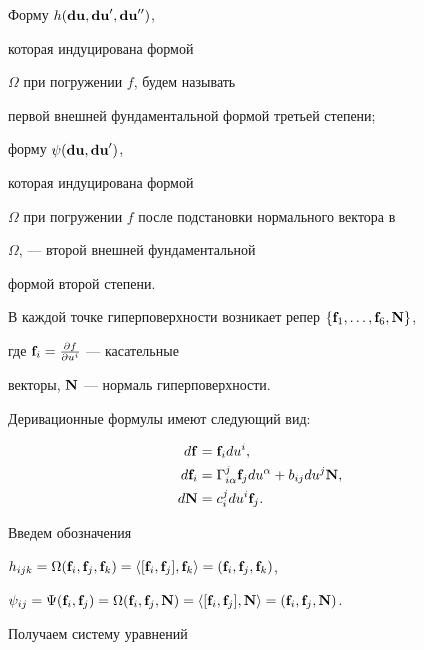Форму $h(\bold{du}, \bold{du}', \bold{du}'')$,


которая индуцирована формой


$\Omega$ при погружении $f$, будем называть


первой внешней фундаментальной формой третьей степени;


форму $\psi(\bold{du}, \bold{du}')$,


которая индуцирована формой


$\Omega$ при погружении $f$ после подстановки нормального вектора в


$\Omega$, --- второй внешней фундаментальной


формой второй степени.





В каждой точке гиперповерхности возникает репер $\{\bold{f}_1,\dotsc,


\bold{f}_6, \bold{N}\}$,


где $\bold{f}_i={\frac{\partial f}{\partial u^i}}$ --- касательные


векторы, $\bold{N}$ --- нормаль гиперповерхности.


Деривационные формулы имеют следующий вид:


\begin{align*}


d\bold{f}&=\bold{f}_idu^i, \\


d\bold{f}_i&=\Gamma_{i\alpha }^j\bold{f}_jdu^{\alpha


}+b_{ij}du^j\bold{N},\\


d\bold{N}&=c_{i}^{j}du^i\bold{f}_j.


\end{align*}


Введем обозначения


$h_{ijk}=\Omega(\bold{f}_i, \bold{f}_j, \bold{f}_k)=


\langle [\bold{f}_i, \bold{f}_j], \bold{f}_k\rangle=


(\bold{f}_i, \bold{f}_j, \bold{f}_k)$,


$\psi _{ij}=\Psi(\bold{f}_i,


\bold{f}_j)=\Omega(\bold{f}_i, \bold{f}_j, \bold{N})=


\langle [\bold{f}_i, \bold{f}_j], \bold{N}\rangle


=(\bold{f}_i, \bold{f}_j, \bold{N})$.


Получаем систему уравнений


